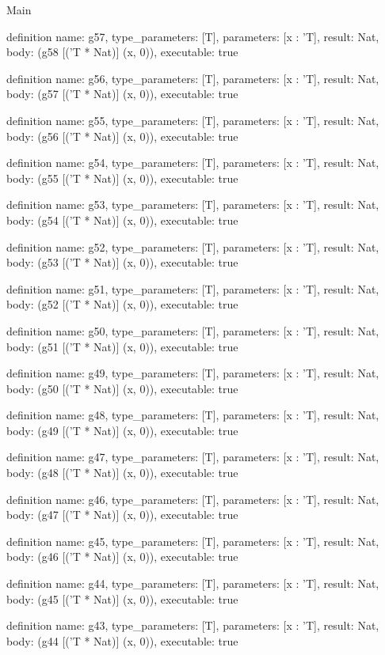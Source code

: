 \begin{lexlean}{Main}
\begin{semanticmodule}
definition{
  name: g57,
  type_parameters: [T],
  parameters: [x : 'T],
  result: Nat,
  body: (g58 [('T * Nat)] (x, 0)),
  executable: true
}

definition{
  name: g56,
  type_parameters: [T],
  parameters: [x : 'T],
  result: Nat,
  body: (g57 [('T * Nat)] (x, 0)),
  executable: true
}

definition{
  name: g55,
  type_parameters: [T],
  parameters: [x : 'T],
  result: Nat,
  body: (g56 [('T * Nat)] (x, 0)),
  executable: true
}

definition{
  name: g54,
  type_parameters: [T],
  parameters: [x : 'T],
  result: Nat,
  body: (g55 [('T * Nat)] (x, 0)),
  executable: true
}

definition{
  name: g53,
  type_parameters: [T],
  parameters: [x : 'T],
  result: Nat,
  body: (g54 [('T * Nat)] (x, 0)),
  executable: true
}

definition{
  name: g52,
  type_parameters: [T],
  parameters: [x : 'T],
  result: Nat,
  body: (g53 [('T * Nat)] (x, 0)),
  executable: true
}

definition{
  name: g51,
  type_parameters: [T],
  parameters: [x : 'T],
  result: Nat,
  body: (g52 [('T * Nat)] (x, 0)),
  executable: true
}

definition{
  name: g50,
  type_parameters: [T],
  parameters: [x : 'T],
  result: Nat,
  body: (g51 [('T * Nat)] (x, 0)),
  executable: true
}

definition{
  name: g49,
  type_parameters: [T],
  parameters: [x : 'T],
  result: Nat,
  body: (g50 [('T * Nat)] (x, 0)),
  executable: true
}

definition{
  name: g48,
  type_parameters: [T],
  parameters: [x : 'T],
  result: Nat,
  body: (g49 [('T * Nat)] (x, 0)),
  executable: true
}

definition{
  name: g47,
  type_parameters: [T],
  parameters: [x : 'T],
  result: Nat,
  body: (g48 [('T * Nat)] (x, 0)),
  executable: true
}

definition{
  name: g46,
  type_parameters: [T],
  parameters: [x : 'T],
  result: Nat,
  body: (g47 [('T * Nat)] (x, 0)),
  executable: true
}

definition{
  name: g45,
  type_parameters: [T],
  parameters: [x : 'T],
  result: Nat,
  body: (g46 [('T * Nat)] (x, 0)),
  executable: true
}

definition{
  name: g44,
  type_parameters: [T],
  parameters: [x : 'T],
  result: Nat,
  body: (g45 [('T * Nat)] (x, 0)),
  executable: true
}

definition{
  name: g43,
  type_parameters: [T],
  parameters: [x : 'T],
  result: Nat,
  body: (g44 [('T * Nat)] (x, 0)),
  executable: true
}


\end{semanticmodule}
\end{lexlean}
